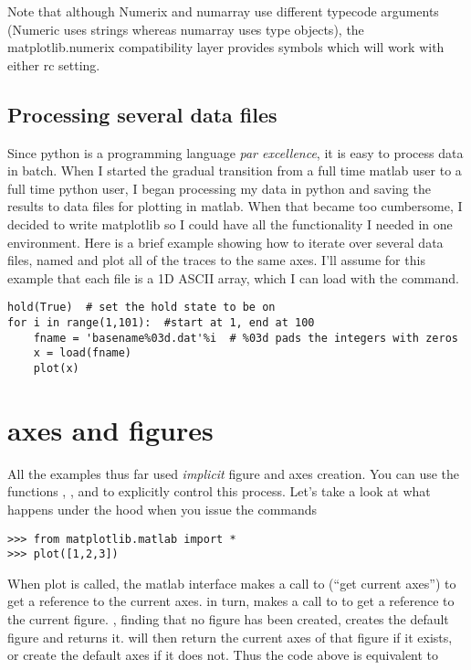 \documentclass[]{book}
\begin{document}
\noindent Note that although Numerix and numarray use different
typecode arguments (Numeric uses strings whereas numarray uses type
objects), the matplotlib.numerix compatibility layer provides symbols
which will work with either  rc setting.

\subsection{Processing several data files}
\label{sec:multiple_files}

Since python is a programming language \textit{par excellence}, it is
easy to process data in batch.  When I started the gradual transition
from a full time matlab user to a full time python user, I began
processing my data in python and saving the results to data files for
plotting in matlab.  When that became too cumbersome, I decided to
write matplotlib so I could have all the functionality I needed in one
environment.  Here is a brief example showing how to iterate over
several data files, named  and plot all of the traces to
the same axes.  I'll assume for this example that each file is a 1D
ASCII array, which I can load with the  command.

\begin{lstlisting}
hold(True)  # set the hold state to be on
for i in range(1,101):  #start at 1, end at 100
    fname = 'basename%03d.dat'%i  # %03d pads the integers with zeros
    x = load(fname)
    plot(x)
\end{lstlisting}


\section{axes and figures}
\label{sec:axes_and_figures}
All the examples thus far used \textit{implicit} figure and axes
creation.  You can use the functions , ,
and  to explicitly control this process.  Let's take a look
at what happens under the hood when you issue the commands

\begin{lstlisting}
>>> from matplotlib.matlab import *
>>> plot([1,2,3])
\end{lstlisting}

When plot is called, the matlab interface makes a call to 
(``get current axes'') to get a reference to the current axes.
 in turn, makes a call to  to get a reference to
the current figure.  , finding that no figure has been
created, creates the default figure  and returns it.
 will then return the current axes of that figure if it
exists, or create the default axes  if it does
not.  Thus the code above is equivalent to 
\end{document}
